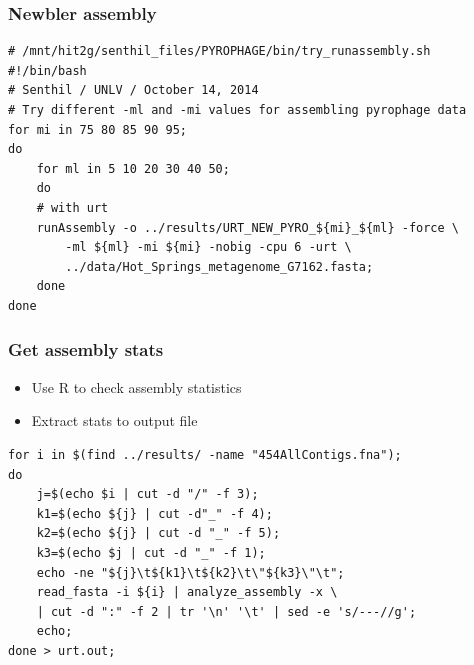 \documentclass[a4paper, twoside]{article}
\begin{document}
\subsubsection{Newbler assembly}
\label{sec:org78fef15}
\begin{verbatim}
# /mnt/hit2g/senthil_files/PYROPHAGE/bin/try_runassembly.sh
#!/bin/bash
# Senthil / UNLV / October 14, 2014
# Try different -ml and -mi values for assembling pyrophage data
for mi in 75 80 85 90 95;
do
    for ml in 5 10 20 30 40 50;
    do
	# with urt
	runAssembly -o ../results/URT_NEW_PYRO_${mi}_${ml} -force \
	    -ml ${ml} -mi ${mi} -nobig -cpu 6 -urt \
	    ../data/Hot_Springs_metagenome_G7162.fasta;
    done
done
\end{verbatim}
\subsubsection{Get assembly stats}
\label{sec:orge79e765}
\begin{itemize}
\item Use R to check assembly statistics
\item Extract stats to output file
\end{itemize}
\begin{verbatim}
for i in $(find ../results/ -name "454AllContigs.fna");
do 
    j=$(echo $i | cut -d "/" -f 3);
    k1=$(echo ${j} | cut -d"_" -f 4);
    k2=$(echo ${j} | cut -d "_" -f 5);
    k3=$(echo $j | cut -d "_" -f 1);
    echo -ne "${j}\t${k1}\t${k2}\t\"${k3}\"\t";
    read_fasta -i ${i} | analyze_assembly -x \
	| cut -d ":" -f 2 | tr '\n' '\t' | sed -e 's/---//g';
    echo;
done > urt.out;
\end{verbatim}
\end{document}
